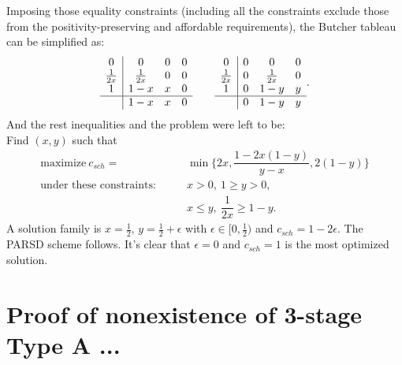 Imposing those equality constraints (including all the constraints exclude those from the positivity-preserving and affordable requirements), the Butcher tableau can be simplified as:
\begin{equation}
  \begin{array}{c | c c c}
  	     0       & 0            & 0 & 0 \\
  	\frac{1}{2x} & \frac{1}{2x} & 0 & 0 \\
  	     1       & 1-x          & x & 0 \\ \hline
  	             & 1-x          & x & 0
  \end{array}
  \qquad
  \begin{array}{c | c c c}
  	     0       & 0 & 0            & 0 \\
  	\frac{1}{2x} & 0 & \frac{1}{2x} & 0 \\
  	     1       & 0 & 1-y          & y \\ \hline
  	             & 0 & 1-y          & y
  \end{array}.
\end{equation}
And the rest inequalities and the problem were left to be: \\
Find $(x,y)$ such that
\begin{align*}
\text{maximize} ~ c_{sch} = &\min \{ 2x, \dfrac{1-2x(1-y)}{y-x}, 2(1-y)\}\\
 \text{under these constraints:} \qquad & x > 0, ~ 1 \geq y > 0, \\
 & x \leq y, ~\dfrac{1}{2x} \geq 1-y.
\end{align*}
A solution family is $x=\frac{1}{2}$, $y=\frac{1}{2} + \epsilon$ with $\epsilon \in [0, \frac{1}{2})$ and $c_{sch} = 1 - 2\epsilon$.
The PARSD scheme follows.
It's clear that $\epsilon = 0$ and $c_{sch} = 1$ is the most optimized solution.

\section{Proof of nonexistence of 3-stage Type A ...}
\label{app:noTypeA}

